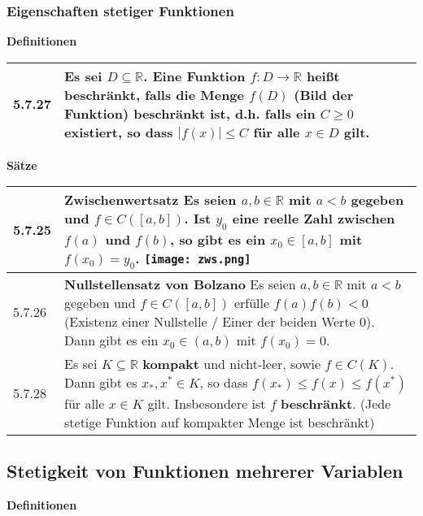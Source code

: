 \subsubsection{Eigenschaften stetiger Funktionen}

        \noindent
    \textbf{Definitionen}
      
    \begin{longtable}{p{1cm} p{16cm}}
        \toprule

        5.7.27& Es sei $D \subseteq \mathbb{R}$. Eine Funktion $f: D \rightarrow \mathbb{R}$ hei\ss t beschränkt, falls die Menge
                $f(D)$ (Bild der Funktion) beschränkt ist, d.h. falls ein $C \geq 0$ existiert, so dass $|f(x)| \leq C$ für alle $x \in D$ gilt. \\

        \bottomrule

    \end{longtable}
    

    \noindent 
    \textbf{Sätze}
    
    \begin{longtable}{p{1cm} p{16cm}}
        \toprule

        5.7.25& \textbf{Zwischenwertsatz} \hfill \break
                Es seien $a,b \in \mathbb{R}$ mit $a < b$ gegeben und $f \in C([a,b])$. Ist $y_0$ eine reelle Zahl zwischen $f(a)$ und $f(b)$,
                so gibt es ein $x_0 \in [a,b]$ mit $f(x_0) = y_0$. \hfill \break
                \texttt{[image: zws.png]} \\
        \midrule
        5.7.26& \textbf{Nullstellensatz von Bolzano} \hfill \break
                Es seien $a,b \in \mathbb{R}$ mit $a < b$ gegeben und $f \in C([a,b])$ erfülle $f(a)f(b) < 0$ (Existenz einer Nullstelle /
                Einer der beiden Werte 0).
                Dann gibt es ein $x_0 \in (a,b)$ mit $f(x_0) = 0$. \\
        \midrule
        5.7.28& Es sei $K \subseteq \mathbb{R}$ \textbf{kompakt} und nicht-leer, sowie $f \in C(K)$. Dann gibt es $x_*, x^* \in K$, so dass
                $f(x_*) \leq f(x) \leq f(x^*)$ für alle $x \in K$ gilt. Insbesondere ist $f$ \textbf{beschränkt}. (Jede stetige Funktion auf 
                kompakter Menge ist beschränkt)\\

        \bottomrule
    \end{longtable}
    

\subsection{Stetigkeit von Funktionen mehrerer Variablen}
        \noindent
    \textbf{Definitionen}
      
